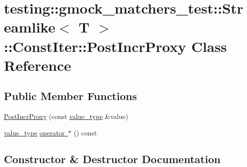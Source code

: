 \hypertarget{classtesting_1_1gmock__matchers__test_1_1Streamlike_1_1ConstIter_1_1PostIncrProxy}{}\section{testing\+::gmock\+\_\+matchers\+\_\+test\+::Streamlike$<$ T $>$\+::Const\+Iter\+::Post\+Incr\+Proxy Class Reference}
\label{classtesting_1_1gmock__matchers__test_1_1Streamlike_1_1ConstIter_1_1PostIncrProxy}
\subsection*{Public Member Functions}
\begin{DoxyCompactItemize}
\item 
\mbox{\hyperlink{classtesting_1_1gmock__matchers__test_1_1Streamlike_1_1ConstIter_1_1PostIncrProxy_a1915f8db9943b0a995c4e01d6120fc80}{Post\+Incr\+Proxy}} (const \mbox{\hyperlink{classtesting_1_1gmock__matchers__test_1_1Streamlike_a7e2c2e021676c1ed5dea63cdd019661c}{value\+\_\+type}} \&value)
\item 
\mbox{\hyperlink{classtesting_1_1gmock__matchers__test_1_1Streamlike_a7e2c2e021676c1ed5dea63cdd019661c}{value\+\_\+type}} \mbox{\hyperlink{classtesting_1_1gmock__matchers__test_1_1Streamlike_1_1ConstIter_1_1PostIncrProxy_a8b1cf42698f3315e9d8c65891bfeb8d7}{operator $\ast$}} () const
\end{DoxyCompactItemize}


\subsection{Constructor \& Destructor Documentation}
\mbox{\label{classtesting_1_1gmock__matchers__test_1_1Streamlike_1_1ConstIter_1_1PostIncrProxy_a1915f8db9943b0a995c4e01d6120fc80}} 
